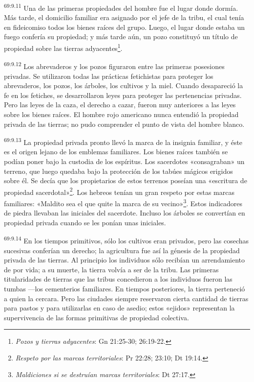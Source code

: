 \par
\textsuperscript{69:9.11} Una de las primeras propiedades del hombre fue el lugar donde dormía. Más tarde, el domicilio familiar era asignado por el jefe de la tribu, el cual tenía en fideicomiso todos los bienes raíces del grupo. Luego, el lugar donde estaba un fuego confería su propiedad; y más tarde aún, un pozo constituyó un título de propiedad sobre las tierras adyacentes\footnote{\textit{Pozos y tierras adyacentes}: Gn 21:25-30; 26:19-22.}.

\par
\textsuperscript{69:9.12} Los abrevaderos y los pozos figuraron entre las primeras posesiones privadas. Se utilizaron todas las prácticas fetichistas para proteger los abrevaderos, los pozos, los árboles, los cultivos y la miel. Cuando desapareció la fe en los fetiches, se desarrollaron leyes para proteger las pertenencias privadas. Pero las leyes de la caza, el derecho a cazar, fueron muy anteriores a las leyes sobre los bienes raíces. El hombre rojo americano nunca entendió la propiedad privada de las tierras; no pudo comprender el punto de vista del hombre blanco.

\par
\textsuperscript{69:9.13} La propiedad privada pronto llevó la marca de la insignia familiar, y éste es el origen lejano de los emblemas familiares. Los bienes raíces también se podían poner bajo la custodia de los espíritus. Los sacerdotes «consagraban» un terreno, que luego quedaba bajo la protección de los tabúes mágicos erigidos sobre él. Se decía que los propietarios de estos terrenos poseían una «escritura de propiedad sacerdotal»\footnote{\textit{Respeto por las marcas territoriales}: Pr 22:28; 23:10; Dt 19:14.}. Los hebreos tenían un gran respeto por estas marcas familiares: «Maldito sea el que quite la marca de su vecino»\footnote{\textit{Maldiciones si se destruían marcas territoriales}: Dt 27:17.}. Estos indicadores de piedra llevaban las iniciales del sacerdote. Incluso los árboles se convertían en propiedad privada cuando se les ponían unas iniciales.

\par
\textsuperscript{69:9.14} En los tiempos primitivos, sólo los cultivos eran privados, pero las cosechas sucesivas conferían un derecho; la agricultura fue así la génesis de la propiedad privada de las tierras. Al principio los individuos sólo recibían un arrendamiento de por vida; a su muerte, la tierra volvía a ser de la tribu. Las primeras titularidades de tierras que las tribus concedieron a los individuos fueron las tumbas ---los cementerios familiares. En tiempos posteriores, la tierra perteneció a quien la cercara. Pero las ciudades siempre reservaron cierta cantidad de tierras para pastos y para utilizarlas en caso de asedio; estos «ejidos» representan la supervivencia de las formas primitivas de propiedad colectiva.

